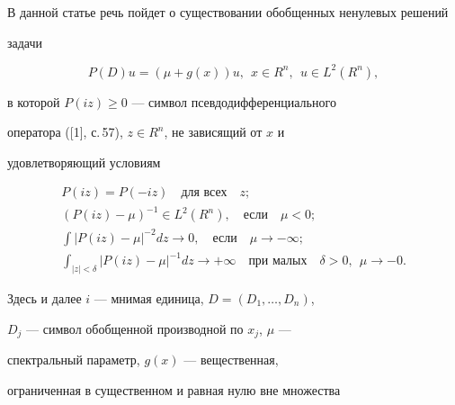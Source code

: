 

\maketitle


\label{begin}








В данной статье речь пойдет о существовании обобщенных ненулевых решений


задачи


\begin{equation}


P(D)u=(\mu +g(x))u, \ \ x \in R^{n},\ \ u \in L^{2}{(R^{n})},


\end{equation}


в которой $P(iz) \ge 0$ --- символ псевдодифференциального


оператора ([1], с.\,57), $z \in R^{n}$, не зависящий от $x$ и


удовлетворяющий условиям


\begin{gather*}


P(iz) = P(-iz) \quad \text{для всех} \quad z; \\


%


( P(iz) - \mu )^{-1} \in L^{2}{(R^{n})},\quad \text{если} \quad


\mu < 0 ; \\


%


\int {| P(iz)-\mu |}^{-2}dz \to 0,\quad


\text{если} \quad \mu \to -\infty; \\


%


\int_{|z|<\delta}|P(iz)-\mu|^{-1}d z\to+\infty\quad


\text{при малых} \quad \delta>0,\ \ \mu\to-0.


\end{gather*}


Здесь и далее $i$ --- мнимая единица, $D=(D_{1},\dotsc,D_{n})$,


$D_{j}$ --- символ обобщенной производной по $x_{j}$, $\mu$ ---


спектральный параметр, $g(x)$ --- вещественная,


ограниченная в существенном и равная нулю вне множества


